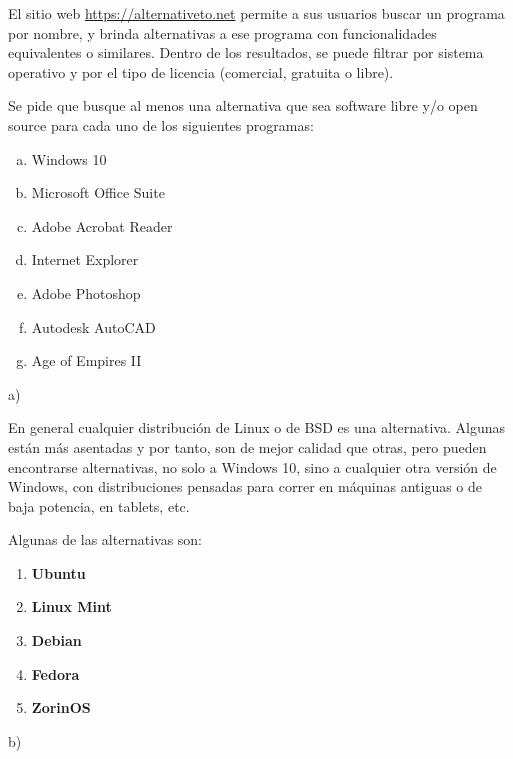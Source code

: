 \begin{exercise}
El sitio web \href{https://alternativeto.net}{https://alternativeto.net} permite
a sus usuarios buscar un programa por nombre, y brinda alternativas a ese programa
con funcionalidades equivalentes o similares. Dentro de los resultados, se puede
filtrar por sistema operativo y por el tipo de licencia (comercial, gratuita o libre).

Se pide que busque al menos una alternativa que sea software libre y/o open
source para cada uno de los siguientes programas:
\begin{enumerate}[a)]
    \item Windows 10
    \item Microsoft Office Suite
    \item Adobe Acrobat Reader
    \item Internet Explorer
    \item Adobe Photoshop
    \item Autodesk AutoCAD
    \item Age of Empires II
\end{enumerate}
\end{exercise}

\noindent a)

En general cualquier distribución de Linux o de BSD es una alternativa.
Algunas están más asentadas y por tanto, son de mejor calidad que otras,
pero pueden encontrarse alternativas, no solo a Windows 10, sino a cualquier
otra versión de Windows, con distribuciones pensadas para correr en
máquinas antiguas o de baja potencia, en tablets, etc.

Algunas de las alternativas son:
\begin{enumerate}
    \item \textbf{Ubuntu}
    \item \textbf{Linux Mint}
    \item \textbf{Debian}
    \item \textbf{Fedora}
    \item \textbf{ZorinOS}
\end{enumerate}

\noindent b)

